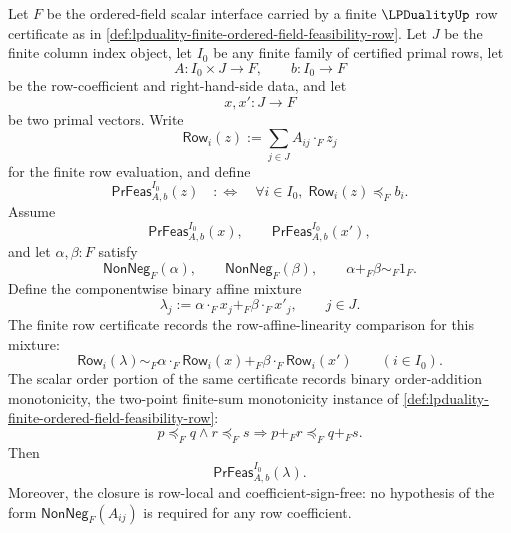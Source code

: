 \begin{theorem}
\label{thm:lpduality-primal-feasibility-binary-convex-closure}
Let $F$ be the ordered-field scalar interface carried by a finite $\LPDualityUp$ row certificate as in \autoref{def:lpduality-finite-ordered-field-feasibility-row}. Let $J$ be the finite column index object, let $I_0$ be any finite family of certified primal rows, let
$$
A:I_0\times J\to F,
\qquad
b:I_0\to F
$$
be the row-coefficient and right-hand-side data, and let
$$
x,x':J\to F
$$
be two primal vectors. Write
$$
\mathsf{Row}_{i}(z):=\sum_{j\in J} A_{ij}\cdot_F z_j
$$
for the finite row evaluation, and define
$$
\mathsf{PrFeas}_{A,b}^{I_0}(z)
\quad:\Longleftrightarrow\quad
\forall i\in I_0,\; \mathsf{Row}_{i}(z)\preceq_F b_i .
$$
Assume
$$
\mathsf{PrFeas}_{A,b}^{I_0}(x),
\qquad
\mathsf{PrFeas}_{A,b}^{I_0}(x'),
$$
and let $\alpha,\beta:F$ satisfy
$$
\mathsf{NonNeg}_F(\alpha),
\qquad
\mathsf{NonNeg}_F(\beta),
\qquad
\alpha+_F\beta\sim_F 1_F .
$$
Define the componentwise binary affine mixture
$$
\lambda_j:=\alpha\cdot_F x_j+_F\beta\cdot_F x'_j,
\qquad
j\in J .
$$
The finite row certificate records the row-affine-linearity comparison for this mixture:
$$
\mathsf{Row}_{i}(\lambda)
\sim_F
\alpha\cdot_F \mathsf{Row}_{i}(x)+_F\beta\cdot_F \mathsf{Row}_{i}(x')
\qquad
(i\in I_0).
$$
The scalar order portion of the same certificate records binary order-addition monotonicity, the two-point finite-sum monotonicity instance of \autoref{def:lpduality-finite-ordered-field-feasibility-row}:
$$
p\preceq_F q
\land
r\preceq_F s
\Longrightarrow
p+_F r\preceq_F q+_F s .
$$
Then
$$
\mathsf{PrFeas}_{A,b}^{I_0}(\lambda).
$$
Moreover, the closure is row-local and coefficient-sign-free: no hypothesis of the form $\mathsf{NonNeg}_F(A_{ij})$ is required for any row coefficient.
\end{theorem}
